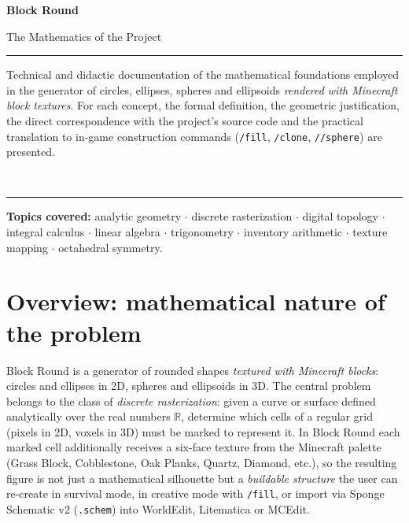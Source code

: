 \documentclass[12pt,a4paper]{scrartcl}
\newcommand{\code}[1]{\texttt{\small #1}}
\newcommand{\cmd}[1]{\textcolor{earth}{\texttt{\small #1}}}
\begin{document}
\begin{titlepage}
  \centering
  \vspace*{3.5cm}
  {\sffamily\bfseries\fontsize{56}{60}\selectfont \color{accent} Block Round\par}
  \vspace{0.7cm}
  {\sffamily\LARGE\color{muted} The Mathematics of the Project\par}
  \vspace{1.4cm}
  {\color{rule}\rule{0.6\textwidth}{0.6pt}\par}
  \vspace{0.9cm}
  \begin{minipage}{0.82\textwidth}
    \centering\color{ink}\large
    Technical and didactic documentation of the mathematical foundations employed in the generator of circles, ellipses, spheres and ellipsoids \emph{rendered with Minecraft block textures}. For each concept, the formal definition, the geometric justification, the direct correspondence with the project's source code and the practical translation to in-game construction commands (\cmd{/fill}, \cmd{/clone}, \cmd{//sphere}) are presented.
  \end{minipage}
  \vspace{0.9cm}\\
  {\color{rule}\rule{0.6\textwidth}{0.6pt}\par}
  \vspace{2cm}
  \begin{minipage}{0.78\textwidth}
    \centering\sffamily\small\color{muted}
    \textbf{Topics covered:} analytic geometry $\cdot$ discrete rasterization $\cdot$ digital topology $\cdot$ integral calculus $\cdot$ linear algebra $\cdot$ trigonometry $\cdot$ inventory arithmetic $\cdot$ texture mapping $\cdot$ octahedral symmetry.
  \end{minipage}
\end{titlepage}

\renewcommand{\contentsname}{\color{accent}Table of Contents}
\tableofcontents
\thispagestyle{fancy}
\newpage

\section{Overview: mathematical nature of the problem}

Block Round is a generator of rounded shapes \emph{textured with Minecraft blocks}: circles and ellipses in 2D, spheres and ellipsoids in 3D. The central problem belongs to the class of \emph{discrete rasterization}: given a curve or surface defined analytically over the real numbers $\mathbb{R}$, determine which cells of a regular grid (pixels in 2D, voxels in 3D) must be marked to represent it. In Block Round each marked cell additionally receives a six-face texture from the Minecraft palette (Grass Block, Cobblestone, Oak Planks, Quartz, Diamond, etc.), so the resulting figure is not just a mathematical silhouette but a \emph{buildable structure} the user can re-create in survival mode, in creative mode with \cmd{/fill}, or import via Sponge Schematic v2 (\code{.schem}) into WorldEdit, Litematica or MCEdit.
\end{document}
